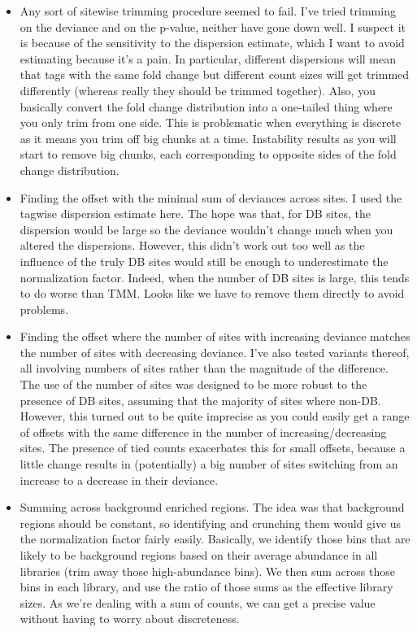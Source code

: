 \documentclass[12pt]{report}
\begin{document}
\begin{itemize}
\item Any sort of sitewise trimming procedure seemed to fail. 
I've tried trimming on the deviance and on the p-value, neither have gone down well.  
I suspect it is because of the sensitivity to the dispersion estimate, which I want to avoid estimating because it's a pain. 
In particular, different dispersions will mean that tags with the same fold change but different count sizes will get trimmed differently (whereas really they should be trimmed together).
Also, you basically convert the fold change distribution into a one-tailed thing where you only trim from one side. 
This is problematic when everything is discrete as it means you trim off big chunks at a time. 
Instability results as you will start to remove big chunks, each corresponding to opposite sides of the fold change distribution.

\item  Finding the offset with the minimal sum of deviances across sites. 
I used the tagwise dispersion estimate here.
The hope was that, for DB sites, the dispersion would be large so the deviance wouldn't change much when you altered the dispersions. 
However, this didn't work out too well as the influence of the truly DB sites would still be enough to underestimate the normalization factor. 
Indeed, when the number of DB sites is large, this tends to do worse than TMM. 
Looks like we have to remove them directly to avoid problems.

\item Finding the offset where the number of sites with increasing deviance matches the number of sites with decreasing deviance.
I've also tested variants thereof, all involving numbers of sites rather than the magnitude of the difference. 
The use of the number of sites was designed to be more robust to the presence of DB sites, assuming that the majority of sites where non-DB. 
However, this turned out to be quite imprecise as you could easily get a range of offsets with the same difference in the number of increasing/decreasing sites. 
The  presence of tied counts exacerbates this for small offsets, because a little change results in (potentially) a big number of sites switching from an increase to a decrease in their deviance.

\item Summing across background enriched regions. 
The idea was that background regions should be constant, so identifying and crunching them would give us the normalization factor fairly easily. 
Basically, we identify those bins that are likely to be background regions based on their average abundance in all libraries (trim away those high-abundance bins).
We then sum across those bins in each library, and use the ratio of those sums as the effective library sizes.
As we're dealing with a sum of counts, we can get a precise value without having to worry about discreteness. 


\end{itemize}
\end{document}
